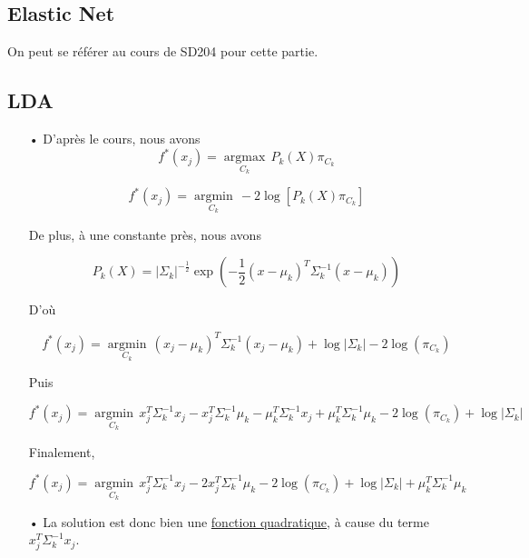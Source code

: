 \documentclass[a4paper, 10pt]{article}
\begin{document}
	\subsection{Elastic Net}

On peut se référer au cours de SD204 pour cette partie.
	
	\subsection{LDA}

\begin{itemize}

	\item[•] D'après le cours, nous avons \[ f^{*}(x_{j}) = \underset{C_{k}}{\operatorname{argmax}} \, P_{k}(X) \pi_{C_{k}} \]

\[ f^{*}(x_{j}) = \underset{C_{k}}{\operatorname{argmin}} \, -2 \log \left[ P_{k}(X)\pi_{C_{k}} \right] \]

De plus, à une constante près, nous avons

\[ P_{k}(X) = |\Sigma_{k}|^{- \frac{1}{2}} \exp \left( - \frac{1}{2} \left( x - \mu_{k} \right)^{T} \Sigma_{k}^{-1} \left( x - \mu_{k} \right) \right) \]

D'où

\[ f^{*}(x_{j}) = \underset{C_k}{\operatorname{argmin}} \, \left( x_{j} - \mu_{k} \right)^{T} \Sigma_{k}^{-1} \left( x_{j} - \mu_{k} \right) + \log | \Sigma_{k} | - 2 \log \left( \pi_{C_{k}} \right) \]

Puis

\[ f^{*}(x_{j}) = \underset{C_k}{\operatorname{argmin}} \, x_{j}^{T} \Sigma_{k}^{-1}x_{j} - x_{j}^{T} \Sigma_{k}^{-1} \mu_{k} - \mu_{k}^{T} \Sigma_{k}^{-1} x_{j}  + \mu_{k}^{T}  \Sigma_{k}^{-1} \mu_{k} - 2 \log \left( \pi_{C_{k}} \right) +  \log | \Sigma_{k} | \]

Finalement,

\[ \boxed{f^{*}(x_{j}) = \underset{C_k}{\operatorname{argmin}} \, x_{j}^{T} \Sigma_{k}^{-1} x_{j} - 2 x_{j}^{T} \Sigma_{k}^{-1} \mu_{k} - 2 \log \left( \pi_{C_{k}} \right) + \log | \Sigma_{k} |+ \mu_{k}^{T} \Sigma_{k}^{-1} \mu_{k}} \]

	\item[•] La solution est donc bien une \underline{fonction quadratique}, à cause du terme $x_{j}^{T} \Sigma_{k}^{-1} x_{j}$.


\end{itemize}
\end{document}
